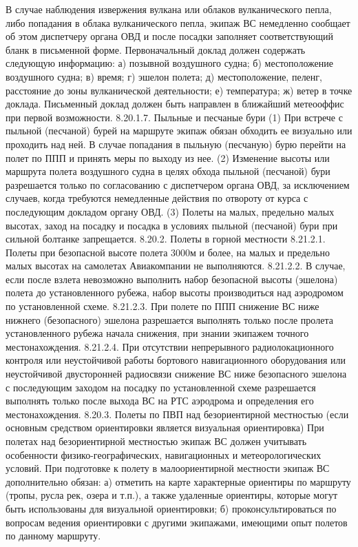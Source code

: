 В случае наблюдения извержения вулкана или облаков вулканического пепла, либо попадания в облака вулканического пепла, экипаж ВС немедленно сообщает об этом диспетчеру органа ОВД и после посадки заполняет соответствующий бланк в письменной форме.
Первоначальный доклад должен содержать следующую информацию:
а)	позывной воздушного судна;
б)	местоположение воздушного судна;
в)	время;
г)	эшелон полета;
д)	местоположение, пеленг, расстояние до зоны вулканической деятельности;
е)	температура;
ж)	ветер в точке доклада.
Письменный доклад должен быть направлен в ближайший метеооффис при первой возможности.
8.20.1.7.	Пыльные и песчаные бури
(1) При встрече с пыльной (песчаной) бурей на маршруте экипаж обязан обходить ее визуально или проходить над ней. В случае попадания в пыльную (песчаную) бурю перейти на полет по ППП и принять меры по выходу из нее.
(2) Изменение высоты или маршрута полета воздушного судна в целях обхода пыльной (песчаной) бури разрешается только по согласованию с диспетчером органа ОВД, за исключением случаев, когда требуются немедленные действия по отвороту от курса с последующим докладом органу ОВД.
(3) Полеты на малых, предельно малых высотах, заход на посадку и посадка в условиях пыльной (песчаной) бури при сильной болтанке запрещается.
8.20.2.	Полеты в горной местности
8.21.2.1. Полеты при безопасной высоте полета 3000м и более, на малых и предельно малых высотах на самолетах Авиакомпании не выполняются.
8.21.2.2. В случае, если после взлета невозможно выполнить набор безопасной высоты (эшелона) полета до установленного рубежа, набор высоты производиться над аэродромом по установленной схеме.
8.21.2.3. При полете по ППП снижение ВС ниже нижнего (безопасного) эшелона разрешается выполнять только после пролета установленного рубежа начала снижения, при знании экипажем точного местонахождения.
8.21.2.4. При отсутствии непрерывного радиолокационного контроля или неустойчивой работы бортового навигационного оборудования или неустойчивой двусторонней радиосвязи снижение ВС ниже безопасного эшелона с последующим заходом на посадку по установленной схеме разрешается выполнять только после выхода ВС на РТС аэродрома и определения его местонахождения.
8.20.3.	Полеты по ПВП над безориентирной местностью
(если основным средством ориентировки является визуальная ориентировка)
При полетах над безориентирной местностью экипаж ВС должен учитывать особенности физико-географических, навигационных и метеорологических условий.
При подготовке к полету в малоориентирной местности экипаж ВС дополнительно обязан:
а)	отметить на карте характерные ориентиры по маршруту (тропы, русла рек, озера и т.п.), а также удаленные ориентиры, которые могут быть использованы для визуальной ориентировки;
б)	проконсультироваться по вопросам ведения ориентировки с другими экипажами, имеющими опыт полетов по данному маршруту.

